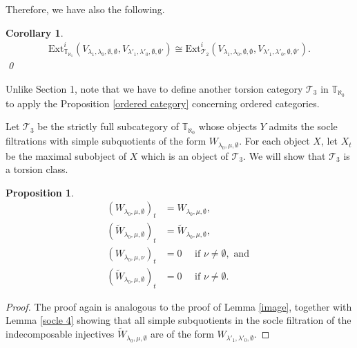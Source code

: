 \documentclass[openany, a4paper]{amsbook}
\newtheorem{prop}[thm]{Proposition}
\newtheorem{cor}[thm]{Corollary}
\theoremstyle{definition}
\numberwithin{equation}{chapter}
\newcommand{\T}[1]{{\mathbb{T}}_{\aleph_{#1}}}
\newcommand{\soc}[2]{\mathrm{soc}^{#1}({#2})}
\newcommand{\Ext}[4]{\mathrm{Ext}^{#1}_{#2}({#3}, {#4})}
\begin{document}
Therefore, we have also the following.

\begin{cor}
    \begin{align}
        \Ext{i}{\T{1}}{V_{\lambda_1, \lambda_0, \emptyset, \emptyset}}{V_{\lambda'_1, \lambda'_0, \emptyset, \emptyset'}} 
        \cong 
        \Ext{i}{\mathcal{T}_2}{V_{\lambda_1, \lambda_0, \emptyset, \emptyset}}{V_{\lambda'_1, \lambda'_0, \emptyset, \emptyset'}}.
    \end{align}
    \qed
\end{cor}

Unlike Section 1, note that we have to define another torsion category $\mathcal{T}_3$ in $\T{0}$ to apply the Proposition \ref{ordered category} concerning ordered categories.

Let $\mathcal{T}_3$ be the strictly full subcategory of $\T{0}$ whose objects $Y$ admits the socle filtrations with simple subquotients of the form $W_{\lambda_0, \mu, \emptyset}$. For each object $X$, let $X_t$ be the maximal subobject of $X$ which is an object of $\mathcal{T}_3$. 
We will show that $\mathcal{T}_3$ is a torsion class. 

\begin{prop}
    \begin{align}
        (W_{\lambda_0, \mu, \emptyset})_t &= W_{\lambda_0, \mu, \emptyset},\\
        (\tilde{W}_{\lambda_0, \mu, \emptyset})_t &=  \tilde{W}_{\lambda_0, \mu, \emptyset},\\
        (W_{\lambda_0, \mu, \nu})_t &=  0 \quad \text{ if } \nu \neq \emptyset, \text{ and }\\
        (\tilde{W}_{\lambda_0, \mu, \emptyset})_t &=  0 \quad \text{ if } \nu \neq \emptyset.
    \end{align}
\end{prop}

\begin{proof}
    The proof again is analogous to the proof of Lemma \ref{image}, together with Lemma \ref{socle 4} showing that all simple subquotients in the socle filtration of the indecomposable injectives $\tilde{W}_{\lambda_0, \mu, \emptyset}$ are of the form ${W}_{\lambda'_1, \lambda'_0, \emptyset}$.
\end{proof}
\end{document}
